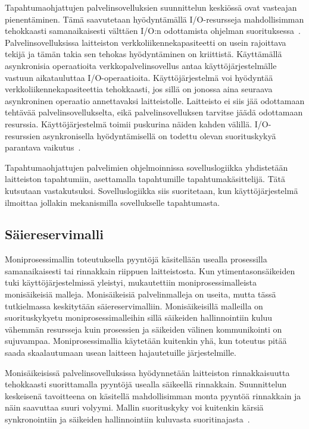 \documentclass[finnish]{tktltiki2}
\theoremstyle{definition}
\theoremstyle{remark}
\begin{document}
Tapahtumaohjattujen palvelinsovelluksien suunnittelun keskiössä
ovat vasteajan pienentäminen.
Tämä saavutetaan hyödyntämällä I/O-resursseja mahdollisimman tehokkaasti
samanaikaisesti välttäen I/O:n odottamista ohjelman suorituksessa~\cite{pai_flash:_1999}.
Palvelinsovelluksissa
laitteiston verkkoliikennekapasiteetti on usein rajoittava tekijä ja tämän takia
sen tehokas hyödyntäminen on kriittistä.
Käyttämällä asynkronisia operaatioita verkkopalvelinsovellus
antaa käyttöjärjestelmälle vastuun aikatauluttaa I/O-operaatioita.
Käyttöjärjestelmä voi hyödyntää verkkoliikennekapasiteettia
tehokkaasti, jos sillä on jonossa aina seuraava asynkroninen operaatio
annettavaksi laitteistolle. Laitteisto ei siis jää odottamaan tehtävää
palvelinsovellukselta, eikä palvelinsovelluksen tarvitse jäädä
odottamaan resurssia. Käyttöjärjestelmä toimii
puskurina näiden kahden välillä.
I/O-resurssien asynkronisella hyödyntämisellä on todettu
olevan suorituskykyä parantava vaikutus~\cite{hu_applying_1998}.

Tapahtumaohjattujen palvelimien ohjelmoinnissa sovelluslogiikka yhdistetään
laitteiston tapahtumiin, asettamalla tapahtumille tapahtumakäsittelijä.
Tätä kutsutaan vastakutsuksi. Sovelluslogiikka siis suoritetaan, kun
käyttöjärjestelmä ilmoittaa jollakin mekanismilla sovellukselle tapahtumasta.


\subsection{Säiereservimalli}
Moniprosessimallin toteutuksella pyyntöjä käsitellään
usealla prosessilla samanaikaisesti tai rinnakkain riippuen laitteistosta.
Kun ytimentasonsäikeiden tuki käyttöjärjestelmissä yleistyi, mukautettiin
moniprosessimalleista monisäikeisiä malleja.
Monisäikeisiä palvelinmalleja on useita, mutta tässä tutkielmassa keskitytään säiereservimalliin.
Monisäikeisillä malleilla on suorituskykyetu moniprosessimalleihin sillä säikeiden
hallinnointiin
kuluu vähemmän resursseja kuin prosessien ja säikeiden välinen kommunikointi on sujuvampaa.
Moniprosessimallia käytetään kuitenkin yhä, kun toteutus pitää
saada skaalautumaan usean laitteen hajautetuille järjestelmille.

Monisäikeisissä palvelinsovelluksissa hyödynnetään laitteiston
rinnakkaisuutta tehokkaasti suorittamalla pyyntöjä usealla säikeellä rinnakkain.
Suunnittelun keskeisenä tavoitteena on käsitellä mahdollisimman monta pyyntöä rinnakkain ja
näin saavuttaa suuri volyymi. Mallin suorituskyky voi kuitenkin
kärsiä synkronointiin ja säikeiden hallinnointiin kuluvasta
suoritinajasta~\cite{pyarali_proactor_1997}.
\end{document}

